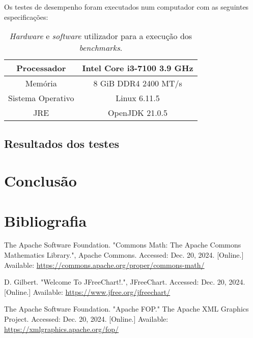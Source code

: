 \documentclass[12pt, a4paper, titlepage]{article}
\begin{document}
Os testes de desempenho foram executados num computador com as seguintes especificações:

\begin{table}[H]
    \begin{center}
        \begin{tabular}{|c|c|}
            \hline Processador       & Intel Core i3-7100 3.9 GHz  \\
            \hline Memória           & 8 GiB DDR4 2400 MT/s        \\
            \hline Sistema Operativo & Linux 6.11.5                \\
            \hline JRE               & OpenJDK 21.0.5              \\
            \hline
        \end{tabular}
    \end{center}

    \caption{\emph{Hardware} e \emph{software} utilizador para a execução dos \emph{benchmarks}.}
    \label{hardware-software}
\end{table}

\subsection{Resultados dos testes}

\section{Conclusão}

\section{Bibliografia}
\def\refname{}
\vspace{-1.5cm}
\begin{thebibliography}{9}
        The Apache Software Foundation. "Commons Math: The Apache Commons Mathematics Library."{},
        Apache Commons. Accessed: Dec. 20, 2024. [Online.] Available:
        \url{https://commons.apache.org/proper/commons-math/}

        D. Gilbert. "Welcome To JFreeChart!."{}, JFreeChart. Accessed: Dec. 20, 2024. [Online.]
        Available: \url{https://www.jfree.org/jfreechart/}

        The Apache Software Foundation. "Apache FOP."{} The Apache XML Graphics Project. Accessed:
        Dec. 20, 2024. [Online.] Available: \url{https://xmlgraphics.apache.org/fop/}
\end{thebibliography}
\end{document}
